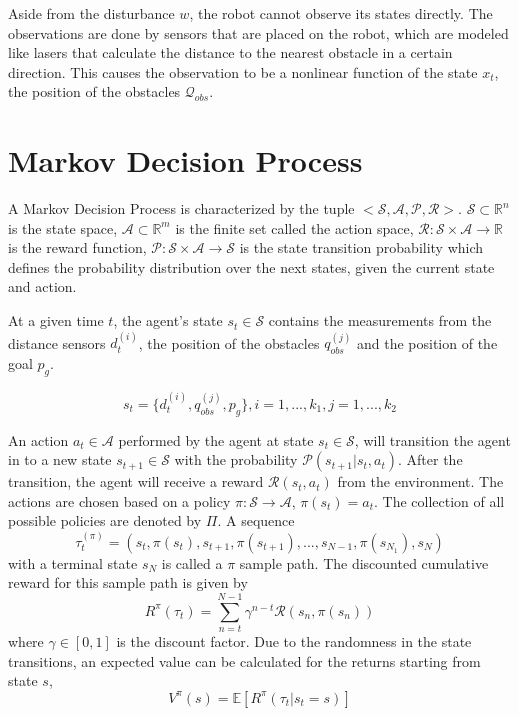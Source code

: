 \documentclass{article}
\begin{document}
Aside from the disturbance $w$, the robot cannot observe its states directly. The observations are done by sensors that are placed on the robot, which are modeled like lasers that calculate the distance to the nearest obstacle in a certain direction. This causes the observation to be a nonlinear function of the state $x_t$, the position of the obstacles $\mathcal{Q}_{obs}$. 


\section{Markov Decision Process}
A Markov Decision Process is characterized by the tuple $<\mathcal{S},\mathcal{A},\mathcal{P},\mathcal{R}>$. $\mathcal{S} \subset \mathbb{R}^n$ is the state space, $\mathcal{A} \subset \mathbb{R}^m$ is the finite set called the action space, $\mathcal{R}: \mathcal{S} \times \mathcal{A} \to \mathbb{R}$ is the reward function, $\mathcal{P}: \mathcal{S} \times \mathcal{A} \to \mathcal{S}$ is the state transition probability which defines the probability distribution over the next states, given the current state and action.


At a given time $t$, the agent's state  $s_t \in \mathcal{S}$ contains the measurements from the distance sensors $d_t^{(i)}$, the position of the obstacles $q_{obs}^{(j)}$ and the position of the goal $p_g$.

\begin{equation}
    s_t = \{d_t^{(i)},q_{obs}^{(j)},p_g\}, i=1,...,k_1, j=1,...,k_2
\end{equation}

An action $a_t \in \mathcal{A}$ performed by the agent at state $s_t \in \mathcal{S}$, will transition the agent in to a new state $s_{t+1} \in \mathcal{S}$ with the probability $\mathcal{P}(s_{t+1}|s_t,a_t)$. After the transition, the agent will receive a reward $\mathcal{R}(s_t,a_t)$ from the environment. The actions are chosen based on a policy $\pi : \mathcal{S} \to \mathcal{A}$, $\pi (s_t) = a_t$. The collection of all possible policies are denoted by $\Pi$. A sequence 
\begin{equation}
    \tau_t^{(\pi)} = (s_t,\pi(s_t),s_{t+1},\pi(s_{t+1}),...,s_{N-1},\pi(s_{N_1}),s_N)
\end{equation}
with a terminal state $s_N$ is called a $\pi$ sample path. The discounted cumulative reward for this sample path is given by
\begin{equation}
    R^{\pi}(\tau_t) = \sum \limits_{n=t}^{N-1} \gamma^{n-t}\mathcal{R}(s_n,\pi(s_n))
\end{equation}
where $\gamma \in [0,1]$ is the discount factor. Due to the randomness in the state transitions, an expected value can be calculated for the returns starting from state $s$,
\begin{equation}
    V^{\pi}(s) = \mathbb{E}[R^{\pi}(\tau_t | s_t = s)]
\end{equation}
\end{document}
